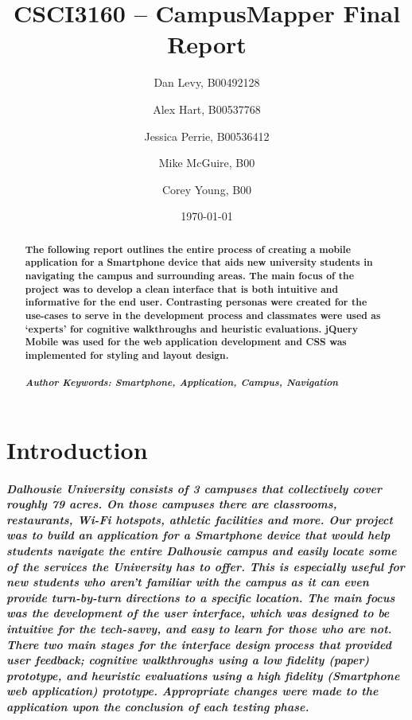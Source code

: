 \documentclass{report}
\title{CSCI3160 -- CampusMapper Final Report}
\author{Dan Levy, B00492128 \and Alex Hart, B00537768 \and Jessica Perrie,
B00536412 \and Mike McGuire, B00 \and Corey Young, B00}
\date{\today}
\begin{document}
\maketitle
\tableofcontents
\listoffigures
\begin{abstract}
    \paragraph{The following report outlines the entire process of creating a mobile
    application for a Smartphone device that aids new university students in
    navigating the campus and surrounding areas. The main focus of the project was
    to develop a clean interface that is both intuitive and informative for the end
    user. Contrasting personas were created for the use-cases to serve in the
    development process and classmates were used as ‘experts’ for cognitive
    walkthroughs and heuristic evaluations. jQuery Mobile was used for the web
    application development and CSS was implemented for styling and layout design.}
    \paragraph{\emph{Author Keywords: Smartphone, Application, Campus, Navigation}}
\end{abstract}
\chapter{Introduction}
    \paragraph{Dalhousie University consists of 3 campuses that collectively cover
    roughly 79 acres. On those campuses there are classrooms, restaurants, Wi-Fi
    hotspots, athletic facilities and more. Our project was to build an application
    for a Smartphone device that would help students navigate the entire Dalhousie
    campus and easily locate some of the services the University has to offer. This
    is especially useful for new students who aren’t familiar with the campus as it
    can even provide turn-by-turn directions to a specific location. The main focus
    was the development of the user interface, which was designed to be intuitive
    for the tech-savvy, and easy to learn for those who are not. There two main
    stages for the interface design process that provided user feedback; cognitive
    walkthroughs using a low fidelity (paper) prototype, and heuristic evaluations
    using a high fidelity (Smartphone web application) prototype. Appropriate
    changes were made to the application upon the conclusion of each testing phase.}
\end{document}
